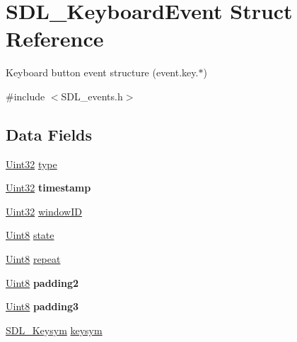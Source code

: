 \hypertarget{struct_s_d_l___keyboard_event}{}\section{S\+D\+L\+\_\+\+Keyboard\+Event Struct Reference}
\label{struct_s_d_l___keyboard_event}


Keyboard button event structure (event.\+key.$\ast$)  




{\ttfamily \#include $<$S\+D\+L\+\_\+events.\+h$>$}

\subsection*{Data Fields}
\begin{DoxyCompactItemize}
\item 
\hyperlink{_s_d_l__stdinc_8h_add440eff171ea5f55cb00c4a9ab8672d}{Uint32} \hyperlink{struct_s_d_l___keyboard_event_aa40a9b05c3154032b9f2d7220e9f08dc}{type}
\item 
\hyperlink{_s_d_l__stdinc_8h_add440eff171ea5f55cb00c4a9ab8672d}{Uint32} {\bfseries timestamp}\hypertarget{struct_s_d_l___keyboard_event_abf1ed7edeab81db9c05d899836a44a2f}{}\label{struct_s_d_l___keyboard_event_abf1ed7edeab81db9c05d899836a44a2f}

\item 
\hyperlink{_s_d_l__stdinc_8h_add440eff171ea5f55cb00c4a9ab8672d}{Uint32} \hyperlink{struct_s_d_l___keyboard_event_a78d9995068d6f40cd78bb8db7351b0a1}{window\+ID}
\item 
\hyperlink{_s_d_l__stdinc_8h_a2944638813a090aa23e62f4da842c3e2}{Uint8} \hyperlink{struct_s_d_l___keyboard_event_a6b8d8e916bc56265a3fd279bd26b6d1b}{state}
\item 
\hyperlink{_s_d_l__stdinc_8h_a2944638813a090aa23e62f4da842c3e2}{Uint8} \hyperlink{struct_s_d_l___keyboard_event_a719e1ec1b2969d941426593f9822ef6d}{repeat}
\item 
\hyperlink{_s_d_l__stdinc_8h_a2944638813a090aa23e62f4da842c3e2}{Uint8} {\bfseries padding2}\hypertarget{struct_s_d_l___keyboard_event_a09e3169fff93f108fc1dab93014eb1fb}{}\label{struct_s_d_l___keyboard_event_a09e3169fff93f108fc1dab93014eb1fb}

\item 
\hyperlink{_s_d_l__stdinc_8h_a2944638813a090aa23e62f4da842c3e2}{Uint8} {\bfseries padding3}\hypertarget{struct_s_d_l___keyboard_event_a2876881016c4222a885f1fabef292d1d}{}\label{struct_s_d_l___keyboard_event_a2876881016c4222a885f1fabef292d1d}

\item 
\hyperlink{struct_s_d_l___keysym}{S\+D\+L\+\_\+\+Keysym} \hyperlink{struct_s_d_l___keyboard_event_a798f36b96d39e1dd994f72890632cf4f}{keysym}
\end{DoxyCompactItemize}


